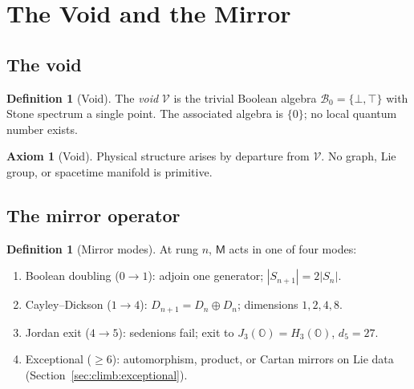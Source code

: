 \documentclass[11pt]{article}
\theoremstyle{plain}
\theoremstyle{definition}
\newtheorem{axiom}[theorem]{Axiom}
\newtheorem{definition}[theorem]{Definition}
\theoremstyle{remark}
\numberwithin{equation}{section}
\newcommand{\Oct}{\mathbb{O}}
\newcommand{\jalg}{J_3(\mathbb{O})}
\newcommand{\Void}{\mathcal{V}}
\newcommand{\Mirror}{\mathsf{M}}
\begin{document}
\section{The Void and the Mirror}
\label{sec:mirror}

\subsection{The void}
\label{sec:mirror:void}

\begin{definition}[Void]\label{def:void}
The \emph{void} $\Void$ is the trivial Boolean algebra
$\mathcal{B}_0=\{\bot,\top\}$ with Stone spectrum a single point. The
associated algebra is $\{0\}$; no local quantum number exists.
\end{definition}

\begin{axiom}[Void]\label{ax:void}
Physical structure arises by departure from $\Void$. No graph, Lie group, or
spacetime manifold is primitive.
\end{axiom}

\subsection{The mirror operator}
\label{sec:mirror:operator}

\begin{definition}[Mirror modes]\label{def:mirror:modes}
At rung $n$, $\Mirror$ acts in one of four modes:
\begin{enumerate}[label=\textbf{M\arabic*.},leftmargin=*]
  \item Boolean doubling ($0\to1$): adjoin one generator; $|S_{n+1}|=2|S_n|$.
  \item Cayley--Dickson ($1\to4$): $D_{n+1}=D_n\oplus D_n$; dimensions
    $1,2,4,8$.
  \item Jordan exit ($4\to5$): sedenions fail; exit to $\jalg=H_3(\Oct)$,
    $d_5=27$.
  \item Exceptional ($\geq6$): automorphism, product, or Cartan mirrors on
    Lie data (Section~\ref{sec:climb:exceptional}).
\end{enumerate}
\end{definition}
\end{document}
